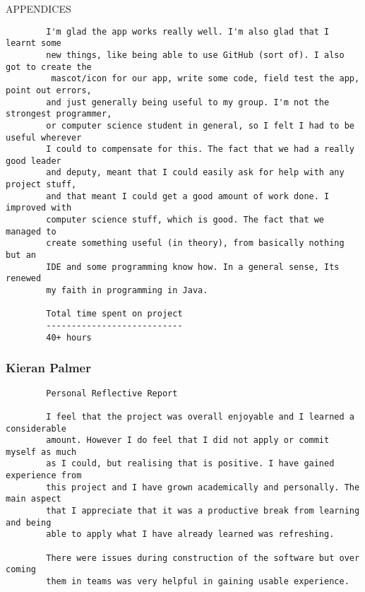 \documentclass{article}
\begin{document}
\begin{section}{APPENDICES}
\begin{verbatim}
		I'm glad the app works really well. I'm also glad that I learnt some 
		new things, like being able to use GitHub (sort of). I also got to create the
		 mascot/icon for our app, write some code, field test the app, point out errors,
		and just generally being useful to my group. I'm not the strongest programmer, 
		or computer science student in general, so I felt I had to be useful wherever 
		I could to compensate for this. The fact that we had a really good leader 
		and deputy,	meant that I could easily ask for help with any project stuff, 
		and that meant I could get a good amount of work done. I improved with 
		computer science stuff, which is good. The fact that we managed to 
		create something useful (in theory), from basically nothing but an 
		IDE and some programming know how. In a general sense, Its renewed 
		my faith in programming in Java. 
		
		Total time spent on project
		---------------------------
		40+ hours
		\end{verbatim}
		
		\clearpage
		\subsubsection{Kieran Palmer}
		\begin{verbatim}
		Personal Reflective Report

		I feel that the project was overall enjoyable and I learned a considerable
		amount. However I do feel that I did not apply or commit myself as much 
		as I could, but realising that is positive. I have gained experience from
		this project and I have grown academically and personally. The main aspect 
		that I appreciate that it was a productive break from learning and being 
		able to apply what I have already learned was refreshing.

		There were issues during construction of the software but over coming 
		them in teams was very helpful in gaining usable experience.
		\end{verbatim}
		
		
		
		
		
	
		
		
		
	\end{section}
\end{document}
